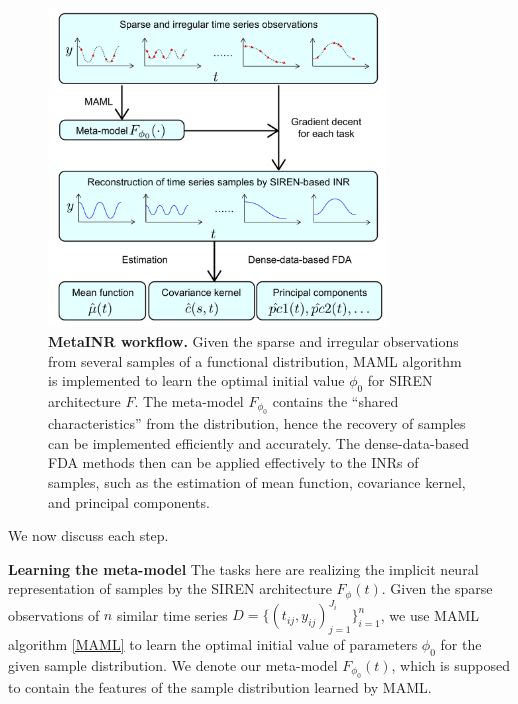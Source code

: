 \documentclass{article}
\begin{document}
\begin{figure}[htb]
  \centering
  \includegraphics[width=0.8\textwidth]{illustration.pdf}
  \caption{\textbf{MetaINR workflow.} Given the sparse and irregular observations from several samples of a functional distribution, MAML algorithm is implemented to learn the optimal initial value $\phi_0$ for SIREN architecture $F$. 
  The meta-model $F_{\phi_0}$ contains the ``shared characteristics'' from the distribution, hence the recovery of samples can be implemented efficiently and accurately.
  The dense-data-based FDA methods then can be applied effectively to the INRs of samples, such as the estimation of mean function, covariance kernel, and principal components.}
  \label{MetaINR workflow}
\end{figure}


We now discuss each step.

\textbf{Learning the meta-model}
The tasks here are realizing the implicit neural representation of samples by the SIREN architecture $F_\phi(t)$.
Given the sparse observations of $n$ similar time series $D=\{(t_{ij},y_{ij})_{j=1}^{J_i}\}_{i=1}^n$,
we use MAML algorithm \ref{MAML} to learn the optimal initial value of parameters $\phi_0$ for the given sample distribution.
We denote our meta-model $F_{\phi_0}(t)$, which is supposed to contain the features of the sample distribution learned by MAML.
\end{document}
